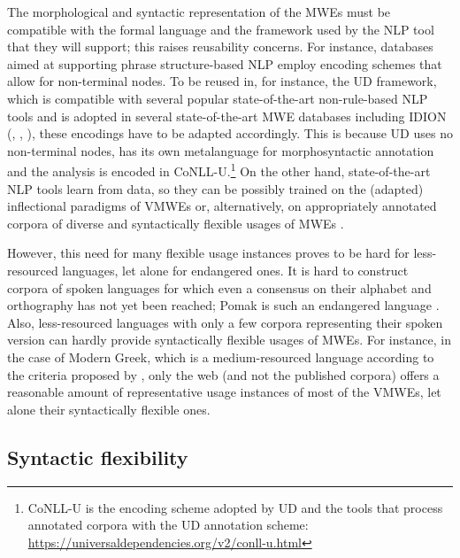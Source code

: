 \documentclass[output=paper,colorlinks,citecolor=brown]{langscibook}
\begin{document}
The morphological and syntactic representation of the MWEs must be compatible with the formal language and the framework used by the NLP tool that they will support; this raises reusability concerns. For instance,  databases aimed at supporting phrase structure-based NLP  \citep{duelme,chechdatabase}  employ encoding schemes that allow for non-terminal nodes. To be reused in, for instance, the UD framework,  which is compatible with several popular state-of-the-art non-rule-based NLP tools and is adopted in several state-of-the-art MWE databases including IDION (, , ), these encodings have to be adapted accordingly. This is because  UD uses no non-terminal nodes, has its own metalanguage for morphosyntactic annotation and the analysis is encoded in CoNLL-U.\footnote{CoNLL-U is the encoding scheme adopted by UD and the tools that process annotated corpora with the UD annotation scheme: {\url{https://universaldependencies.org/v2/conll-u.html}}} On the other hand, state-of-the-art NLP tools learn from data, so they can be possibly trained on the (adapted) inflectional paradigms of VMWEs or, alternatively, on appropriately annotated corpora of diverse and syntactically flexible usages of MWEs \citep{savary-etal-2019-without}.  

However, this need for many flexible usage instances proves to be hard for less-resourced languages, let alone for endangered ones. It is hard to construct corpora of spoken languages for which even a consensus on their alphabet and orthography has not yet been reached;  Pomak is such an endangered language \citep{karahoga-morphologically}. Also, less-resourced languages with only a few corpora representing their spoken version can hardly provide syntactically flexible usages of MWEs. For instance, in the case of Modern Greek, which is a medium-resourced language according to the criteria proposed by  \citet{joshi-etal-2020-state}, only the web (and not the published corpora) offers a reasonable amount of representative usage instances of most of the VMWEs, let alone their syntactically flexible ones. 

\subsection{Syntactic flexibility}
\label{sec:desflexibility}
\end{document}
